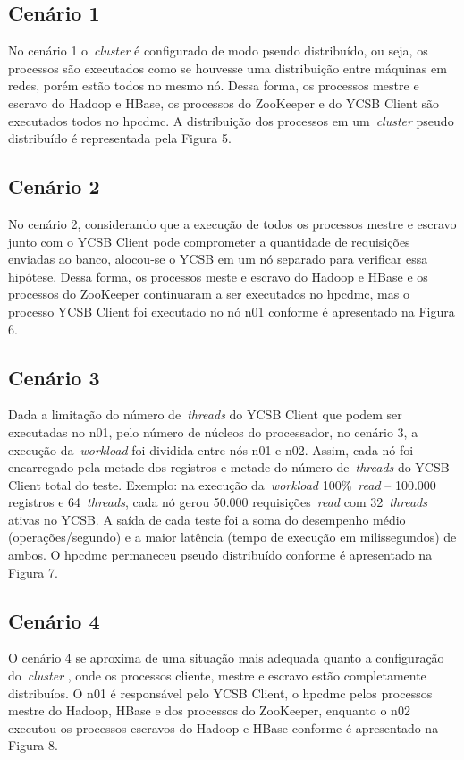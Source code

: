 \documentclass[12pt]{article}
\begin{document}
\subsection{Cenário 1}

No cenário 1 o~\emph{cluster}  é configurado de modo pseudo distribuído, ou seja, os processos são executados como se houvesse uma distribuição entre máquinas em redes, porém estão todos no mesmo nó. Dessa forma, os processos mestre e escravo do Hadoop e HBase, os processos do ZooKeeper e do YCSB Client são executados todos no hpcdmc.
A distribuição dos processos em um~\emph{cluster}  pseudo distribuído é representada pela Figura
5.

\subsection{Cenário 2}

No cenário 2, considerando que a execução de todos os processos mestre e escravo junto com o YCSB Client pode comprometer a quantidade de requisições enviadas ao banco, alocou-se o YCSB em um nó separado para verificar essa hipótese. Dessa forma, os processos meste e escravo do Hadoop e HBase e os processos do ZooKeeper continuaram a ser executados no hpcdmc, mas o processo YCSB Client foi executado no nó n01 conforme é apresentado na Figura 6.

\subsection{Cenário 3}

Dada a limitação do número de~\emph{threads} do YCSB Client que podem ser executadas no n01, pelo número de núcleos do processador, no cenário 3, a execução da~\emph{workload} foi dividida entre nós n01 e n02. Assim, cada nó foi encarregado pela metade dos registros e metade do número de~\emph{threads} do YCSB Client total do teste. Exemplo: na execução da~\emph{workload} 100\%~\emph{read} -- 100.000 registros e 64~\emph{threads}, cada nó gerou 50.000 requisições~\emph{read} com 32~\emph{threads} ativas no YCSB. A saída de cada teste foi a soma do desempenho médio (operações/segundo) e a maior latência (tempo de execução em milissegundos) de ambos. O hpcdmc permaneceu pseudo distribuído conforme é apresentado na Figura 7.

\subsection{Cenário 4}
O cenário 4 se aproxima de uma situação mais adequada quanto a configuração do~\emph{cluster} , onde os processos cliente, mestre e escravo estão completamente distribuíos. O n01 é responsável pelo YCSB Client, o hpcdmc pelos processos mestre do Hadoop, HBase e dos processos do ZooKeeper, enquanto o n02 executou os processos escravos do Hadoop e HBase conforme é apresentado na Figura 8.
\end{document}
